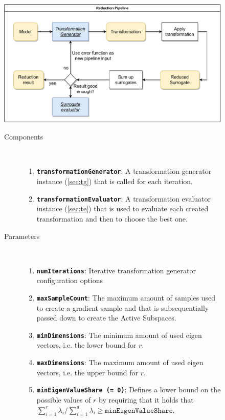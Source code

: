 \documentclass[
  a4paper,  %
  twoside,  %
  bibliography=totoc,
  headsepline,
  cleardoublepage=empty,
  parskip=half,
  draft=false
]{scrbook}
\begin{document}
\begin{figure}[H]

\includegraphics[width=\textwidth]{graphics/ReductionPipeline.pdf}
\vspace{-1.5mm}

\begin{mdframed}[linewidth=0.7px]

\begin{description}
\item[Components] {~ \begin{enumerate}[\indent{}]
\item \texttt{\textbf{transformationGenerator}}: A transformation generator instance (\ref{sec:tg}) that is called for each iteration.
\item \texttt{\textbf{transformationEvaluator}}: A transformation evaluator instance (\ref{sec:te}) that is used to evaluate each created transformation and then to choose the best one.
\end{enumerate}}

\item[Parameters] {~ \begin{enumerate}[\indent{}]
\item \texttt{\textbf{numIterations}}: Iterative transformation generator configuration options
\item \texttt{\textbf{maxSampleCount}}: The maximum amount of samples used to create a gradient sample and that is subsequentially passed down to create the Active Subspaces.
\item \texttt{\textbf{minDimensions}}: The minimum amount of used eigen vectors, i.e. the lower bound for $r$.
\item \texttt{\textbf{maxDimensions}}: The maximum amount of used eigen vectors, i.e. the upper bound for $r$.
\item \texttt{\textbf{minEigenValueShare (= 0)}}: Defines a lower bound on the possible values of $r$ by requiring that it holds that $\sum_{i=1}^r \lambda_i / \sum_{i=1}^d \lambda_i \geq \texttt{minEigenValueShare}$.
\end{enumerate}}
\end{description}

\end{mdframed}
\label{fig:astsg}
\end{figure}
\end{document}
